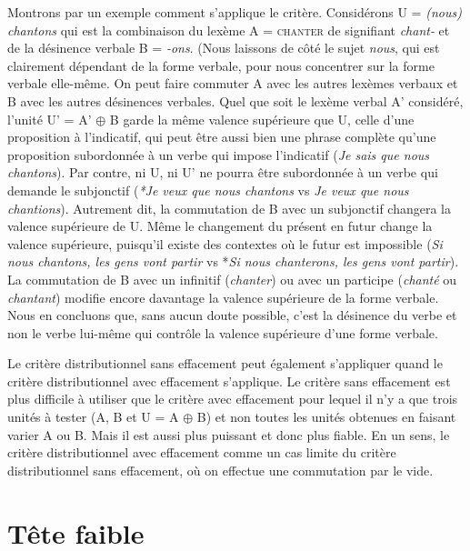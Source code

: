 Montrons par un exemple comment s’applique le critère. Considérons U = \textit{(nous) chantons} qui est la combinaison du lexème A = \textsc{chanter} de signifiant \textit{chant-} et de la désinence verbale B = \textit{{}-ons}. (Nous laissons de côté le sujet \textit{nous}, qui est clairement dépendant de la forme verbale, pour nous concentrer sur la forme verbale elle-même.
On peut faire commuter A avec les autres lexèmes verbaux et B avec les autres désinences verbales. Quel que soit le lexème verbal A’ considéré, l’unité U’ =  A’ ${\oplus}$ B garde la même valence supérieure que U, celle d’une proposition à l’indicatif, qui peut être aussi bien une phrase complète qu’une proposition subordonnée à un verbe qui impose l’indicatif (\textit{Je sais que nous chantons}). Par contre, ni U, ni U’ ne pourra être subordonnée à un verbe qui demande le subjonctif (\textit{*Je veux que nous chantons} vs \textit{Je veux que nous chantions}). Autrement dit, la commutation de B avec un subjonctif changera la valence supérieure de U. Même le changement du présent en futur change la valence supérieure, puisqu’il existe des contextes où le futur est impossible (\textit{Si nous chantons, les gens vont partir} vs *\textit{Si nous chanterons, les gens vont partir}). La commutation de B avec un infinitif (\textit{chanter}) ou avec un participe (\textit{chanté} ou \textit{chantant}) modifie encore davantage la valence supérieure de la forme verbale. Nous en concluons que, sans aucun doute possible, c’est la désinence du verbe et non le verbe lui-même qui contrôle la valence supérieure d’une forme verbale.

Le critère distributionnel sans effacement peut également s’appliquer quand le critère distributionnel avec effacement s’applique. Le critère sans effacement est plus difficile à utiliser que le critère avec effacement pour lequel il n'y a que trois unités à tester (A, B et U = A ${\oplus}$ B) et non toutes les unités obtenues en faisant varier A ou B. Mais il est aussi plus puissant et donc plus fiable. En un sens, le critère distributionnel avec effacement comme un cas limite du critère distributionnel sans effacement, où on effectue une commutation par le vide. 

\section{ Tête faible}\label{sec:3.3.14}

